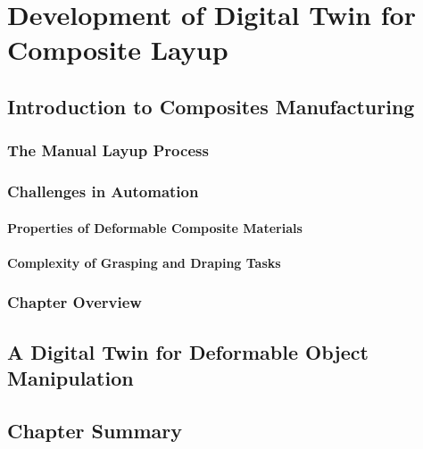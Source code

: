 \chapter{Development of Digital Twin for Composite Layup}
\label{chap:composites}

\section{Introduction to Composites Manufacturing}
    \subsection{The Manual Layup Process}
    \subsection{Challenges in Automation}
        \subsubsection{Properties of Deformable Composite Materials}
        \subsubsection{Complexity of Grasping and Draping Tasks}
    \subsection{Chapter Overview}

\section{A Digital Twin for Deformable Object Manipulation}
   
\section{Chapter Summary}